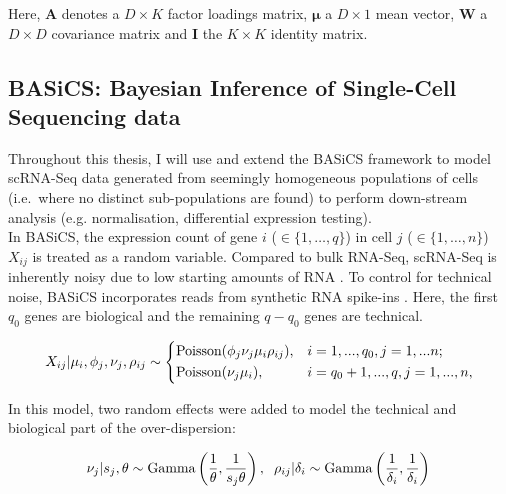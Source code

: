 Here, $\bm{A}$ denotes a $D\times{}K$ factor loadings matrix, $\bm{\mu}$ a $D\times{}1$ mean vector, $\bm{W}$ a $D\times{}D$ covariance matrix and $\bm{I}$ the $K\times{}K$ identity matrix.

\subsection{BASiCS: Bayesian Inference of Single-Cell Sequencing data} 
\label{sec0:BASiCS}

Throughout this thesis, I will use and extend the \gls{BASiCS} framework \citep{Vallejos2015BASiCS, Vallejos2016} to model scRNA-Seq data generated from seemingly homogeneous populations of cells (i.e.~where no distinct sub-populations are found) to perform down-stream analysis (e.g. normalisation, differential expression testing).\\

In BASiCS, the expression count of gene $i$ ($ \in \{1, \ldots, q\}$) in cell $j$ ($\in \{ 1, \ldots ,n\}$) $X_{ij}$ is treated as a random variable. Compared to bulk RNA-Seq, scRNA-Seq is inherently noisy due to low starting amounts of RNA \citep{Brennecke2013}. To control for technical noise, BASiCS incorporates reads from synthetic RNA spike-ins \citep{Jiang2011}. Here, the first $q_0$ genes are biological and the  remaining $q-q_0$ genes are technical.

\begin{equation} 
 X_{ij}|\mu_i,\phi_j,\nu_j,\rho_{ij} \sim
 \left\lbrace
  \begin{aligned}
    &\textnormal{Poisson}(\phi_j\nu_j\mu_i\rho_{ij}), && i=1,...,q_0,j=1,...n;  \\ 
    &\textnormal{Poisson}(\nu_j\mu_i), && i=q_0+1,...,q,j=1,...,n,    	    
  \end{aligned}
\right.
\end{equation} 

In this model, two random effects were added to model the technical and biological part of the over-dispersion:

\begin{equation} 
\nu_j|s_j,\theta \sim \textnormal{Gamma}\left(\frac{1}{\theta},\frac{1}{s_j\theta}\right), \hspace{0.2cm} \rho_{ij}|\delta_i  \sim \textnormal{Gamma}\left(\frac{1}{\delta_i},\frac{1}{\delta_i}\right)\\
\end{equation} 

